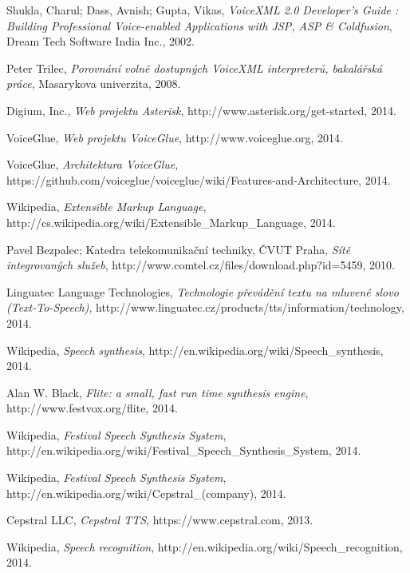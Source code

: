 \documentclass[ing,male,java,dept460,twoside]{diploma}						%
\begin{document}
\begin{thebibliography}{99}

 Shukla, Charul; Dass, Avnish; Gupta, Vikas,
\textit{VoiceXML 2.0 Developer's Guide : Building Professional Voice-enabled Applications with JSP, ASP & Coldfusion}, Dream Tech Software India Inc., 2002.

 Peter Trilec,
\textit{Porovnání volně dostupných VoiceXML interpreterů, bakalářská práce}, Masarykova univerzita, 2008.

 Digium, Inc.,
\textit{Web projektu Asterisk}, http://www.asterisk.org/get-started, 2014.

 VoiceGlue,
\textit{Web projektu VoiceGlue}, http://www.voiceglue.org, 2014.

 VoiceGlue,
\textit{Architektura VoiceGlue}, https://github.com/voiceglue/voiceglue/wiki/Features-and-Architecture, 2014.

 Wikipedia,
\textit{Extensible Markup Language}, http://cs.wikipedia.org/wiki/Extensible\_Markup\_Language, 2014.

 Pavel Bezpalec; Katedra telekomunikační techniky, ČVUT Praha,
\textit{Sítě integrovaných služeb}, http://www.comtel.cz/files/download.php?id=5459‎, 2010.

 Linguatec Language Technologies,
\textit{Technologie převádění textu na mluvené slovo (Text-To-Speech)}, http://www.linguatec.cz/products/tts/information/technology, 2014.

 Wikipedia,
\textit{Speech synthesis}, http://en.wikipedia.org/wiki/Speech\_synthesis, 2014.

 Alan W. Black,
\textit{Flite: a small, fast run time synthesis engine}, http://www.festvox.org/flite, 2014.

 Wikipedia,
\textit{Festival Speech Synthesis System}, http://en.wikipedia.org/wiki/Festival\_Speech\_Synthesis\_System, 2014.

 Wikipedia,
\textit{Festival Speech Synthesis System}, http://en.wikipedia.org/wiki/Cepstral\_(company), 2014.

 Cepstral LLC,
\textit{Cepstral TTS}, https://www.cepstral.com, 2013.

 Wikipedia,
\textit{Speech recognition}, http://en.wikipedia.org/wiki/Speech\_recognition, 2014.


\end{thebibliography}
\end{document}
